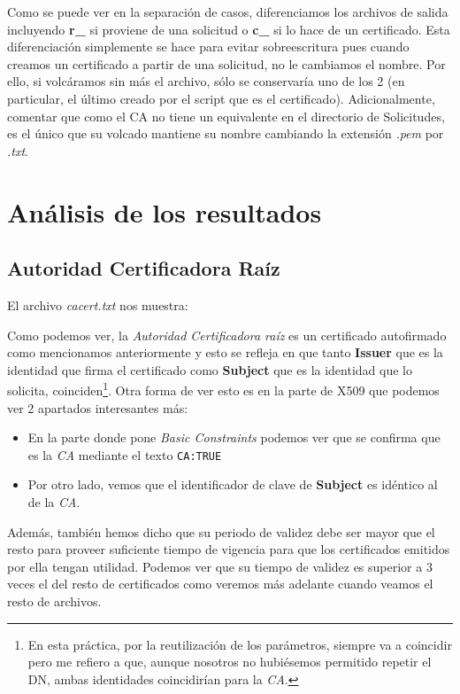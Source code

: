 \documentclass[a4paper, 11pt]{article}
\begin{document}
		Como se puede ver en la separación de casos, diferenciamos los archivos de salida incluyendo \textbf{r\_} si proviene
		de una solicitud o \textbf{c\_} si lo hace de un certificado. Esta diferenciación simplemente se hace para evitar
		sobreescritura pues cuando creamos un certificado a partir de una solicitud, no le cambiamos el nombre. Por ello,
		si volcáramos sin más el archivo, sólo se conservaría uno de los 2 (en particular, el último creado por el script
		que es el certificado). Adicionalmente, comentar que como el CA no tiene un equivalente en el directorio de
		Solicitudes, es el único que su volcado mantiene su nombre cambiando la extensión \textit{.pem} por \textit{.txt}.
		
\section{Análisis de los resultados}
	\subsection{Autoridad Certificadora Raíz}
		El archivo \textit{cacert.txt} nos muestra:
		
		
		Como podemos ver, la \textit{Autoridad Certificadora raíz} es un certificado autofirmado como mencionamos
		anteriormente y esto se refleja en que tanto \textbf{Issuer} que es la identidad que firma el certificado como
		\textbf{Subject} que es la identidad que lo solicita, coinciden\footnote{En esta práctica, por la reutilización
		de los parámetros, siempre va a coincidir pero me refiero a que, aunque nosotros no hubiésemos permitido repetir
		el DN, ambas identidades coincidirían para la \textit{CA}.}. Otra forma de ver esto es en la parte de X509 que
		podemos ver 2 apartados interesantes más:
		\begin{itemize}
			\item En la parte donde pone \textit{Basic Constraints} podemos ver que se confirma que es la \textit{CA}
			mediante el texto \verb|CA:TRUE|
			
			\item Por otro lado, vemos que el identificador de clave de \textbf{Subject} es idéntico al de la \textit{CA}.
		\end{itemize}
		
		Además, también hemos dicho que su periodo de validez debe ser mayor que el resto para proveer suficiente tiempo
		de vigencia para que los certificados emitidos por ella tengan utilidad. Podemos ver que su tiempo de validez es
		superior a 3 veces el del resto de certificados como veremos más adelante cuando veamos el resto de archivos.
		
\end{document}
